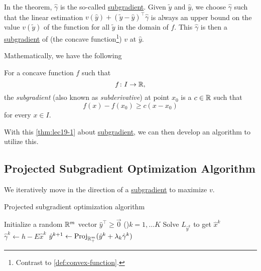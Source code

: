 In the theorem, \(\hat{\gamma}\) is the so-called \hyperref[def:subgradient]{subgradient}. Given \(\widetilde{y}\) and \(\hat{y}\), we choose \(\hat{\gamma}\) such that
the linear estimation \(v(\hat{y})+(\widetilde{y} - \hat{y})^{\top}\hat{\gamma}\) is always an upper bound on the value \(v(\widetilde{y})\) of the function
for all \(\widetilde{y}\) in the domain of \(f\). This \(\hat{\gamma}\) is then a \hyperref[def:subgradient]{subgradient} of (the concave
function\footnote{Contrast to \autoref{def:convex-function}.}) \(v\) at \(\hat{y}\).

Mathematically, we have the following
\begin{definition}[Subgradient]\label{def:subgradient}
	For a concave function \(f\) such that
	\[
		f\colon I\to \mathbb{\MakeUppercase{R}},
	\]
	the \emph{subgradient} (also known as \emph{subderivative}) at point \(x_0\) is a \(c\in \mathbb{\MakeUppercase{R}}\) such that
	\[
		f(x) - f(x_{0})\geq c(x - x_0)
	\]
	for every \(x\in I\).
\end{definition}

With this \autoref{thm:lec19-1} about \hyperref[def:subgradient]{subgradient}, we can then develop an algorithm to utilize this.

\subsection{Projected Subgradient Optimization Algorithm}
\begin{intuition}
	We iteratively move in the direction of a \hyperref[def:subgradient]{subgradient} to maximize \(v\).
\end{intuition}

\par
\begin{algorithm}[H]\label{algo:projected-subgradient-optimization-algorithm}
	\DontPrintSemicolon
	\caption{Projected subgradient optimization algorithm}
	\BlankLine

	Initialize a random \(\mathbb{\MakeUppercase{r}} ^m\) vector \(\hat{y}^{\top}\geq \vec{0}\)\;
	\For(){\(k = 1, \ldots K\)}{
	Solve \(L_{\hat{y}^k}\) to get \(\hat{x}^k\)\;
	\(\hat{\gamma}^k \gets h - E \hat{x}^k\)\;
	\(\hat{y}^{k+1} \gets \mathrm{Proj}_{\mathbb{\MakeUppercase{R}}^m_+}(\hat{y}^k + \lambda_{k}\hat{\gamma}^k) \)\;\label{algo:projected-subgradient-optimization-algorithm:line5}
	}
	\;
\end{algorithm}

